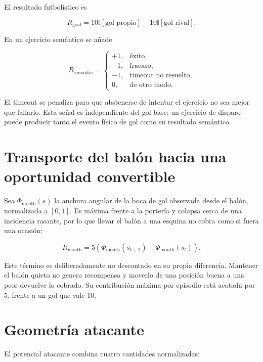 \documentclass[11pt]{article}
\newcommand{\indicator}[1]{\mathbb{I}\!\left[#1\right]}
\begin{document}
El resultado futbolístico es

\begin{equation}
R_{\mathrm{goal}} =
10\indicator{\text{gol propio}} - 10\indicator{\text{gol rival}}.
\end{equation}

En un ejercicio semántico se añade

\begin{equation}
R_{\mathrm{semantic}} =
\begin{cases}
 +1, & \text{éxito},\\
 -1, & \text{fracaso},\\
 -1, & \text{timeout no resuelto},\\
 0,  & \text{de otro modo}.
\end{cases}
\end{equation}

El timeout se penaliza para que abstenerse de intentar el ejercicio no sea mejor que fallarlo.
Esta señal es independiente del gol base: un ejercicio de disparo puede producir tanto el evento
físico de gol como su resultado semántico.

\section{Transporte del balón hacia una oportunidad convertible}

Sea $\Phi_{\mathrm{mouth}}(s)$ la anchura angular de la boca de gol observada desde el balón,
normalizada a $[0,1]$. Es máxima frente a la portería y colapsa cerca de una incidencia rasante,
por lo que llevar el balón a una esquina no cobra como si fuera una ocasión:

\begin{equation}
R_{\mathrm{mouth}} = 5
\left(\Phi_{\mathrm{mouth}}(s_{t+1})-\Phi_{\mathrm{mouth}}(s_t)\right).
\end{equation}

Este término es deliberadamente no descontado en su propia diferencia. Mantener el balón quieto
no genera recompensa y moverlo de una posición buena a una peor devuelve lo cobrado. Su
contribución máxima por episodio está acotada por $5$, frente a un gol que vale $10$.

\section{Geometría atacante}

El potencial atacante combina cuatro cantidades normalizadas:
\end{document}
